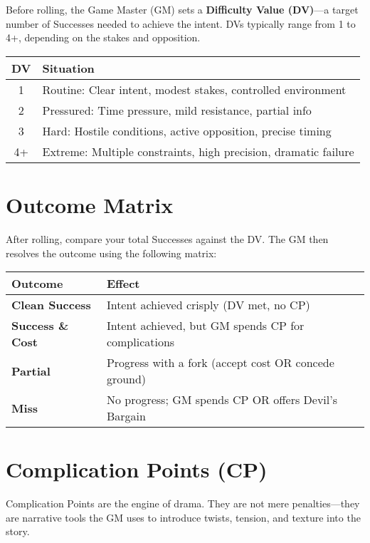 Before rolling, the Game Master (GM) sets a \textbf{Difficulty Value (DV)}—a target number of Successes needed to achieve the intent. DVs typically range from 1 to 4+, depending on the stakes and opposition.

\begin{center}
\begin{tabular}{cl}
\toprule
\textbf{DV} & \textbf{Situation} \\
\midrule
1 & Routine: Clear intent, modest stakes, controlled environment \\
2 & Pressured: Time pressure, mild resistance, partial info \\
3 & Hard: Hostile conditions, active opposition, precise timing \\
4+ & Extreme: Multiple constraints, high precision, dramatic failure \\
\bottomrule
\end{tabular}
\end{center}

\section{Outcome Matrix}

After rolling, compare your total Successes against the DV. The GM then resolves the outcome using the following matrix:

\begin{center}
\begin{tabular}{ll}
\toprule
\textbf{Outcome} & \textbf{Effect} \\
\midrule
\textbf{Clean Success} & Intent achieved crisply (DV met, no CP) \\
\textbf{Success \& Cost} & Intent achieved, but GM spends CP for complications \\
\textbf{Partial} & Progress with a fork (accept cost OR concede ground) \\
\textbf{Miss} & No progress; GM spends CP OR offers Devil’s Bargain \\
\bottomrule
\end{tabular}
\end{center}

\section{Complication Points (CP)}

Complication Points are the engine of drama. They are not mere penalties—they are narrative tools the GM uses to introduce twists, tension, and texture into the story.

